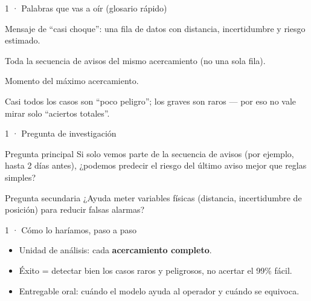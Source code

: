 \begin{frame}{1 · Palabras que vas a oír (glosario rápido)}
  \begin{description}[style=nextline,leftmargin=1.2cm,font=\bfseries\scriptsize]
    \item[CDM] Mensaje de ``casi choque'': una fila de datos con distancia, incertidumbre y riesgo estimado.
    \item[Evento] Toda la secuencia de avisos del mismo acercamiento (no una sola fila).
    \item[TCA] Momento del máximo acercamiento.
    \item[Desbalance] Casi todos los casos son ``poco peligro''; los graves son raros --- por eso no vale mirar solo ``aciertos totales''.
  \end{description}
\end{frame}

\begin{frame}{1 · Pregunta de investigación}
  \begin{block}{Pregunta principal}
    Si solo vemos parte de la secuencia de avisos (por ejemplo, hasta 2 días antes), ¿podemos predecir el riesgo del último aviso mejor que reglas simples?
  \end{block}
  \begin{block}{Pregunta secundaria}
    ¿Ayuda meter variables físicas (distancia, incertidumbre de posición) para reducir falsas alarmas?
  \end{block}
\end{frame}

\begin{frame}{1 · Cómo lo haríamos, paso a paso}
  \vspace{0.4em}
  \begin{itemize}
    \item Unidad de análisis: cada \textbf{acercamiento completo}.
    \item Éxito = detectar bien los casos raros y peligrosos, no acertar el 99\% fácil.
    \item Entregable oral: cuándo el modelo ayuda al operador y cuándo se equivoca.
  \end{itemize}
\end{frame}

